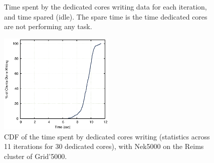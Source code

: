 \begin{figure}
	\begin{center}
	\quad
	\caption[Write and idle time of dedicated cores on Kraken and BluePrint]{Time spent by the 
	dedicated cores writing data for each iteration, and time spared (idle). 
	The spare time is the time dedicated cores are not performing any task.}\label{fig:damaris-sparetime}
	\end{center}
\end{figure}

\begin{figure}
	\includegraphics[width=5.5cm]{figures/nek5-cdf-dc1.eps}
	\caption{CDF of the time spent by dedicated cores writing (statistics across 11 iterations for 30 dedicated cores),
	with Nek5000 on the Reims cluster of Grid'5000.}
	\label{fig:nek5-cdf-dc1}
\end{figure}

